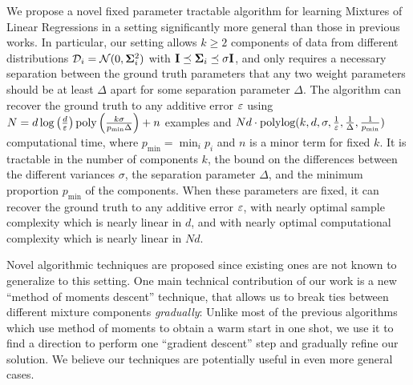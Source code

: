 We propose a novel fixed parameter tractable algorithm for learning Mixtures of Linear Regressions in a setting significantly more general than those in previous works. 
In particular, our setting allows $k \geq 2$ components of data from different distributions $\mathcal{D}_i = \mathcal{N}(0, \bold{\Sigma}_i^2)$ with $\bold{I} \preceq \bold{\Sigma}_i \preceq \sigma \bold{I}$, and only requires a necessary separation between the ground truth parameters that any two weight parameters should be at least $\Delta$ apart for some separation parameter $\Delta$.
The algorithm can recover the ground truth to any additive error $\varepsilon$ using 
$N = d \log\left( \frac{d}{\varepsilon}\right) \textrm{poly}\left(\frac{k\sigma}{p_{\min} \Delta}\right)  + n$  
examples and $Nd \cdot \textrm{polylog}(k,d,\sigma,\frac{1}{\varepsilon}, \frac{1}{\Delta}, \frac{1}{p_{\min}})$ computational time, where $p_{\min} = \min_i p_i$ and $n$ is a minor term for fixed $k$. It is tractable in the number of components $k$, the bound on the differences between the different variances $\sigma$, the separation parameter $\Delta$, and the minimum proportion $p_{\min}$ of the components. When these parameters are fixed, it can recover the ground truth to any additive error $\varepsilon$, with nearly optimal sample complexity which is nearly linear in $d$, %
and with nearly optimal computational complexity which is nearly linear in $Nd$. %

Novel algorithmic techniques are proposed since existing ones are not known to generalize to this setting. 
One main technical contribution of our work is a new ``method of moments descent'' technique, that allows us to break ties between different mixture components \emph{gradually}: Unlike most of the previous algorithms which use method of moments to obtain a warm start in one shot, we use it to find a direction to perform one ``gradient descent'' step and gradually refine our solution.  We believe our  techniques are potentially useful in even more general cases.



